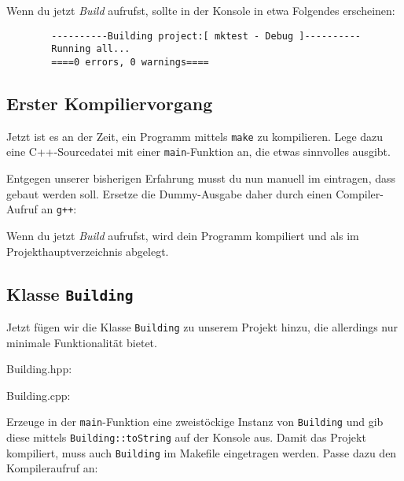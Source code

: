 
Wenn du jetzt \emph{Build} aufrufst, sollte in der Konsole in etwa Folgendes erscheinen:
\begin{verbatim}
        ----------Building project:[ mktest - Debug ]----------
        Running all...
        ====0 errors, 0 warnings====
\end{verbatim}

\subsection{Erster Kompiliervorgang}
Jetzt ist es an der Zeit, ein Programm mittels \texttt{make} zu kompilieren.
Lege dazu eine C++-Sourcedatei  mit einer \lstinline{main}-Funktion an, die etwas sinnvolles ausgibt.

Entgegen unserer bisherigen Erfahrung musst du nun manuell im  eintragen, dass  gebaut werden soll.
Ersetze die Dummy-Ausgabe daher durch einen Compiler-Aufruf an \texttt{g++}:


Wenn du jetzt \emph{Build} aufrufst, wird dein Programm kompiliert und als  im Projekthauptverzeichnis abgelegt.


\subsection{Klasse \lstinline{Building}}
Jetzt fügen wir die Klasse \lstinline{Building} zu unserem Projekt hinzu, die allerdings nur minimale Funktionalität bietet.

Building.hpp:

Building.cpp:

Erzeuge in der \lstinline{main}-Funktion eine zweistöckige Instanz von \lstinline{Building} und gib diese mittels \lstinline{Building::toString} auf der Konsole aus.
Damit das Projekt kompiliert, muss auch \lstinline{Building} im Makefile eingetragen werden.
Passe dazu den Kompileraufruf an:

